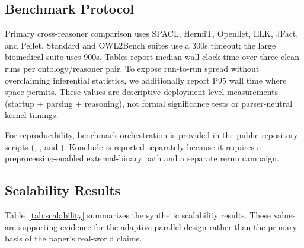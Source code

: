 \documentclass[preprint,12pt,times]{elsarticle}
\begin{document}
\subsection{Benchmark Protocol}
\label{sec:benchmark-protocol}

Primary cross-reasoner comparison uses SPACL, HermiT, Openllet, ELK, JFact, and Pellet. Standard and OWL2Bench suites use a 300s timeout; the large biomedical suite uses 900s. Tables report median wall-clock time over three clean runs per ontology/reasoner pair. To expose run-to-run spread without overclaiming inferential statistics, we additionally report P95 wall time where space permits. These values are descriptive deployment-level measurements (startup + parsing + reasoning), not formal significance tests or parser-neutral kernel timings.

For reproducibility, benchmark orchestration is provided in the public repository scripts (, , and ). Konclude is reported separately because it requires a preprocessing-enabled external-binary path and a separate rerun campaign.

\subsection{Scalability Results}
\label{sec:scalability}

Table~\ref{tab:scalability} summarizes the synthetic scalability results. These values are supporting evidence for the adaptive parallel design rather than the primary basis of the paper's real-world claims.

\begin{table}[htbp]
\centering
\caption{Synthetic Scalability Results}
\label{tab:scalability}
\end{table}
\end{document}
